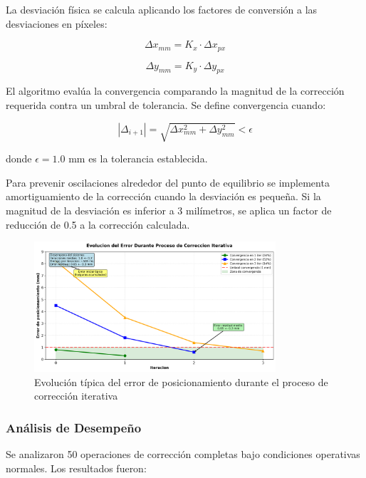 La desviación física se calcula aplicando los factores de conversión a las desviaciones en píxeles:

\begin{equation}
\Delta x_{mm} = K_x \cdot \Delta x_{px}
\end{equation}

\begin{equation}
\Delta y_{mm} = K_y \cdot \Delta y_{px}
\end{equation}

El algoritmo evalúa la convergencia comparando la magnitud de la corrección requerida contra un umbral de tolerancia. Se define convergencia cuando:

\begin{equation}
|\Delta_{i+1}| = \sqrt{\Delta x_{mm}^2 + \Delta y_{mm}^2} < \epsilon
\end{equation}

donde $\epsilon = 1.0$ mm es la tolerancia establecida.

Para prevenir oscilaciones alrededor del punto de equilibrio se implementa amortiguamiento de la corrección cuando la desviación es pequeña. Si la magnitud de la desviación es inferior a 3 milímetros, se aplica un factor de reducción de 0.5 a la corrección calculada.

\begin{figure}[h]
\centering
\includegraphics[width=0.8\textwidth]{imagenes/evolucion_error_correccion.png}
\caption{Evolución típica del error de posicionamiento durante el proceso de corrección iterativa}
\label{fig:evolucion_error}
\end{figure}

\subsubsection{Análisis de Desempeño}

Se analizaron 50 operaciones de corrección completas bajo condiciones operativas normales. Los resultados fueron:

